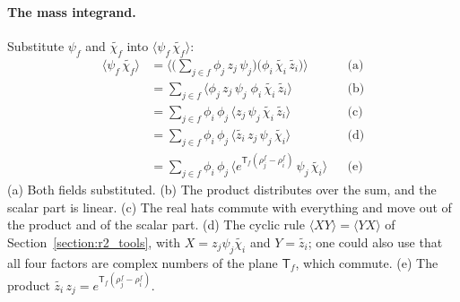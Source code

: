 \paragraph{The mass integrand.} Substitute $\psi_f$ and $\widetilde{\chi_f}$ into $\langle\psi_f\,\widetilde{\chi_f}\rangle$:
\begin{align*}
\langle\psi_f\,\widetilde{\chi_f}\rangle &= \Big\langle\Big(\sum_{j\in f}\phi_j\, z_j\,\psi_j\Big)\Big(\phi_i\,\widetilde{\chi_i}\,\widetilde{z_i}\Big)\Big\rangle && \text{(a)} \\
&= \sum_{j\in f}\big\langle\phi_j\, z_j\,\psi_j\;\phi_i\,\widetilde{\chi_i}\,\widetilde{z_i}\big\rangle && \text{(b)} \\
&= \sum_{j\in f}\phi_i\,\phi_j\,\big\langle z_j\,\psi_j\,\widetilde{\chi_i}\,\widetilde{z_i}\big\rangle && \text{(c)} \\
&= \sum_{j\in f}\phi_i\,\phi_j\,\big\langle \widetilde{z_i}\, z_j\,\psi_j\,\widetilde{\chi_i}\big\rangle && \text{(d)} \\
&= \sum_{j\in f}\phi_i\,\phi_j\,\big\langle e^{\mathsf T_f(\rho_j^f - \rho_i^f)}\,\psi_j\,\widetilde{\chi_i}\big\rangle && \text{(e)}
\end{align*}
(a) Both fields substituted. (b) The product distributes over the sum, and the scalar part is linear. (c) The real hats commute with everything and move out of the product and of the scalar part. (d) The cyclic rule $\langle XY\rangle = \langle YX\rangle$ of Section~\ref{section:r2_tools}, with $X = z_j\psi_j\widetilde{\chi_i}$ and $Y = \widetilde{z_i}$; one could also use that all four factors are complex numbers of the plane $\mathsf T_f$, which commute. (e) The product $\widetilde{z_i}\,z_j = e^{\mathsf T_f(\rho_j^f - \rho_i^f)}$.

